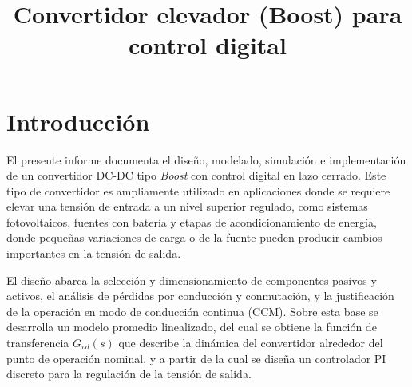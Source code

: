 \documentclass[conference]{IEEEtran}
\begin{document}
\title{Convertidor elevador (Boost) para control digital}

\author{
\and
{}
\and
{}
}

\maketitle


\section{Introducción}

El presente informe documenta el diseño, modelado, simulación e
implementación de un convertidor DC-DC tipo \textit{Boost} con control
digital en lazo cerrado. Este tipo de convertidor es ampliamente
utilizado en aplicaciones donde se requiere elevar una tensión de
entrada a un nivel superior regulado, como sistemas fotovoltaicos,
fuentes con batería y etapas de acondicionamiento de energía, donde
pequeñas variaciones de carga o de la fuente pueden producir cambios
importantes en la tensión de salida.

El diseño abarca la selección y dimensionamiento de componentes pasivos
y activos, el análisis de pérdidas por conducción y conmutación, y la
justificación de la operación en modo de conducción continua (CCM).
Sobre esta base se desarrolla un modelo promedio linealizado, del cual
se obtiene la función de transferencia $G_{vd}(s)$ que describe la
dinámica del convertidor alrededor del punto de operación nominal, y a
partir de la cual se diseña un controlador PI discreto para la
regulación de la tensión de salida.
\end{document}
